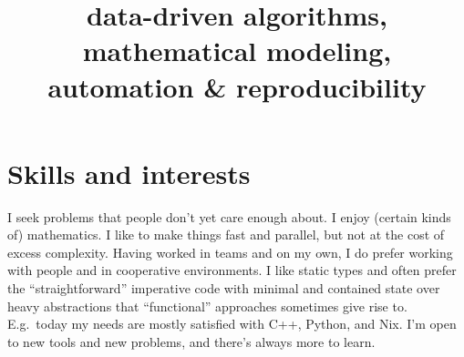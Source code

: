 \documentclass[10pt,a4paper]{moderncv}
\title{data-driven algorithms, mathematical modeling, automation \& reproducibility}
\begin{document}
\maketitle

\section{Skills and interests}

I seek problems that people don't yet care enough about. I enjoy (certain kinds
of) mathematics. I like to make things fast and parallel, but not at the cost
of excess complexity. Having worked in teams and on my own, I do prefer working
with people and in cooperative environments. I like static types and often
prefer the ``straightforward'' imperative code with minimal and contained state
over heavy abstractions that ``functional'' approaches sometimes give rise to.
E.g.\ today my needs are mostly satisfied with C++, Python, and Nix. I'm open
to new tools and new problems, and there's always more to learn.
\end{document}
